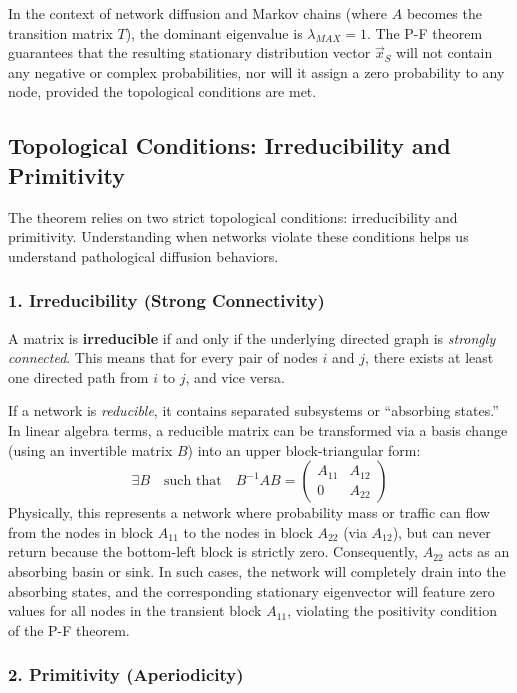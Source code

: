 In the context of network diffusion and Markov chains (where $A$ becomes the transition matrix $T$), the dominant eigenvalue is $\lambda_{MAX} = 1$. The P-F theorem guarantees that the resulting stationary distribution vector $\vec{x}_S$ will not contain any negative or complex probabilities, nor will it assign a zero probability to any node, provided the topological conditions are met.

\subsection{Topological Conditions: Irreducibility and Primitivity}

The theorem relies on two strict topological conditions: irreducibility and primitivity. Understanding when networks violate these conditions helps us understand pathological diffusion behaviors.

\subsubsection{1. Irreducibility (Strong Connectivity)}

A matrix is \textbf{irreducible} if and only if the underlying directed graph is \textit{strongly connected}. This means that for every pair of nodes $i$ and $j$, there exists at least one directed path from $i$ to $j$, and vice versa.

If a network is \textit{reducible}, it contains separated subsystems or ``absorbing states.'' In linear algebra terms, a reducible matrix can be transformed via a basis change (using an invertible matrix $B$) into an upper block-triangular form:
\[
    \exists B \quad \text{such that} \quad B^{-1} A B = \begin{pmatrix} A_{11} & A_{12} \\ 0 & A_{22} \end{pmatrix}
\]
Physically, this represents a network where probability mass or traffic can flow from the nodes in block $A_{11}$ to the nodes in block $A_{22}$ (via $A_{12}$), but can never return because the bottom-left block is strictly zero. Consequently, $A_{22}$ acts as an absorbing basin or sink. In such cases, the network will completely drain into the absorbing states, and the corresponding stationary eigenvector will feature zero values for all nodes in the transient block $A_{11}$, violating the positivity condition of the P-F theorem.

\subsubsection{2. Primitivity (Aperiodicity)}

